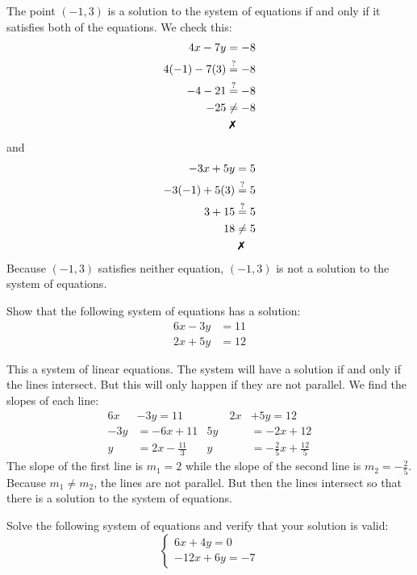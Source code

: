 \documentclass[11pt,letterpaper]{article}
\begin{document}
\sol The point $(-1, 3)$ is a solution to the system of equations if and only if it satisfies both of the equations. We check this:
	\[
	\begin{aligned}
	4x - 7y&= -8 \\
	4(-1) - 7(3)&\stackrel{?}{=} -8 \\
	-4 - 21&\stackrel{?}{=} -8 \\
	-25&\neq -8 \\
	&\;\text{\xmark}
	\end{aligned}
	\]
and
	\[
	\begin{aligned}
	-3x + 5y&= 5 \\
	-3(-1) + 5(3)&\stackrel{?}{=} 5 \\
	3 + 15&\stackrel{?}{=} 5 \\
	18&\neq 5 \\
	&\;\text{\xmark}
	\end{aligned}
	\]
Because $(-1, 3)$ satisfies neither equation, $(-1, 3)$ is not a solution to the system of equations. 



\newpage



 Show that the following system of equations has a solution:
	\[
	\begin{aligned}
	6x - 3y&= 11 \\[0.3cm]
	2x + 5y&= 12
	\end{aligned}
	\] \pspace

\sol This a system of linear equations. The system will have a solution if and only if the lines intersect. But this will only happen if they are not parallel. We find the slopes of each line:
	\[
	\begin{aligned}
	6x &- 3y= 11 &\quad\quad 2x &+ 5y= 12 \\
	-3y&= -6x + 11 & 5y&= -2x + 12 \\
	y&= 2x - \tfrac{11}{3} & y&= -\tfrac{2}{5}x + \tfrac{12}{5}
	\end{aligned}
	\]
The slope of the first line is $m_1= 2$ while the slope of the second line is $m_2= -\frac{2}{5}$. Because $m_1 \neq m_2$, the lines are not parallel. But then the lines intersect so that there is a solution to the system of equations. 



\newpage



 Solve the following system of equations and verify that your solution is valid:
	\[
	\begin{cases}
	6x + 4y= 0 \\[0.3cm]
	-12x + 6y= -7
	\end{cases}
	\] \pspace
\end{document}
